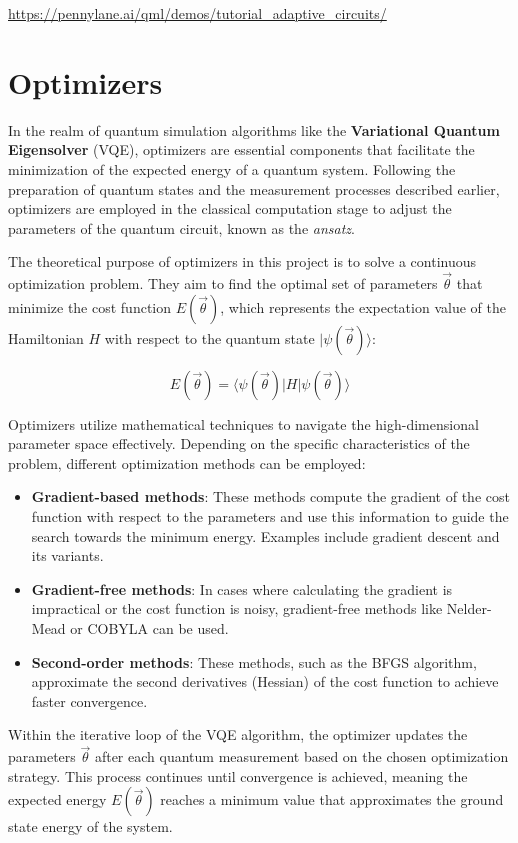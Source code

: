 \url{https://pennylane.ai/qml/demos/tutorial_adaptive_circuits/}

\section{Optimizers}

In the realm of quantum simulation algorithms like the \textbf{Variational Quantum Eigensolver} (VQE), optimizers are essential components that facilitate the minimization of the expected energy of a quantum system. Following the preparation of quantum states and the measurement processes described earlier, optimizers are employed in the classical computation stage to adjust the parameters of the quantum circuit, known as the \textit{ansatz}.

The theoretical purpose of optimizers in this project is to solve a continuous optimization problem. They aim to find the optimal set of parameters \(\vec{\theta}\) that minimize the cost function \(E(\vec{\theta})\), which represents the expectation value of the Hamiltonian \(H\) with respect to the quantum state \(| \psi(\vec{\theta}) \rangle\):

\[
E(\vec{\theta}) = \langle \psi(\vec{\theta}) | H | \psi(\vec{\theta}) \rangle
\]

Optimizers utilize mathematical techniques to navigate the high-dimensional parameter space effectively. Depending on the specific characteristics of the problem, different optimization methods can be employed:

\begin{itemize}
    \item \textbf{Gradient-based methods}: These methods compute the gradient of the cost function with respect to the parameters and use this information to guide the search towards the minimum energy. Examples include gradient descent and its variants.
    \item \textbf{Gradient-free methods}: In cases where calculating the gradient is impractical or the cost function is noisy, gradient-free methods like Nelder-Mead or COBYLA can be used.
    \item \textbf{Second-order methods}: These methods, such as the BFGS algorithm, approximate the second derivatives (Hessian) of the cost function to achieve faster convergence.
\end{itemize}

Within the iterative loop of the VQE algorithm, the optimizer updates the parameters \(\vec{\theta}\) after each quantum measurement based on the chosen optimization strategy. This process continues until convergence is achieved, meaning the expected energy \(E(\vec{\theta})\) reaches a minimum value that approximates the ground state energy of the system.

